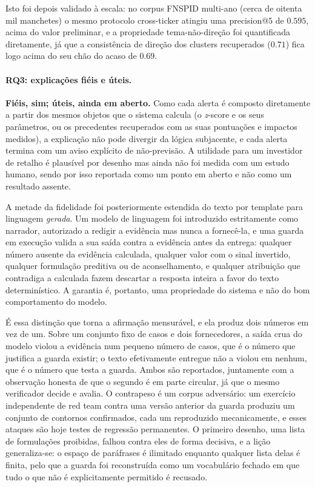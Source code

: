 Isto foi depois validado à escala: no corpus FNSPID
multi-ano (cerca de oitenta mil manchetes) o mesmo protocolo cross-ticker atingiu uma precision@$5$
de $0.595$, acima do valor preliminar, e a propriedade tema-não-direção foi quantificada diretamente,
já que a consistência de direção dos clusters recuperados ($0.71$) fica logo acima do seu chão do
acaso de $0.69$.

\paragraph{RQ3: explicações fiéis e úteis.}
\textbf{Fiéis, sim; úteis, ainda em aberto.} Como cada alerta é composto diretamente a partir dos
mesmos objetos que o sistema calcula (o \emph{z}-score e os seus parâmetros, ou os precedentes
recuperados com as suas pontuações e impactos medidos), a explicação não pode divergir da lógica
subjacente, e cada alerta termina com um aviso explícito de não-previsão. A utilidade para um
investidor de retalho é plausível por desenho mas ainda não foi medida com um estudo humano, sendo
por isso reportada como um ponto em aberto e não como um resultado assente.

A metade da fidelidade foi posteriormente estendida do texto por template para linguagem
\emph{gerada}. Um modelo de linguagem foi introduzido estritamente como narrador, autorizado a
redigir a evidência mas nunca a fornecê-la, e uma guarda em execução valida a sua saída contra a
evidência antes da entrega: qualquer número ausente da evidência calculada, qualquer valor com o
sinal invertido, qualquer formulação preditiva ou de aconselhamento, e qualquer atribuição que
contradiga a calculada fazem descartar a resposta inteira a favor do texto determinístico. A
garantia é, portanto, uma propriedade do sistema e não do bom comportamento do modelo.

É essa distinção que torna a afirmação mensurável, e ela produz dois números em vez de um. Sobre um
conjunto fixo de casos e dois fornecedores, a saída crua do modelo violou a evidência num pequeno
número de casos, que é o número que justifica a guarda existir; o texto efetivamente entregue não a
violou em nenhum, que é o número que testa a guarda. Ambos são reportados, juntamente com a
observação honesta de que o segundo é em parte circular, já que o mesmo verificador decide e avalia.
O contrapeso é um corpus adversário: um exercício independente de red team contra uma versão
anterior da guarda produziu um conjunto de contornos confirmados, cada um reproduzido
mecanicamente, e esses ataques são hoje testes de regressão permanentes. O primeiro desenho, uma
lista de formulações proibidas, falhou contra eles de forma decisiva, e a lição generaliza-se: o
espaço de paráfrases é ilimitado enquanto qualquer lista delas é finita, pelo que a guarda foi
reconstruída como um vocabulário fechado em que tudo o que não é explicitamente permitido é
recusado.

